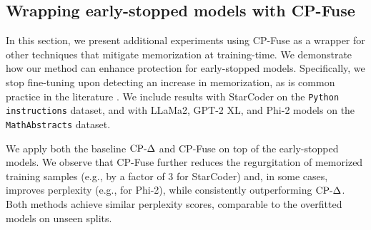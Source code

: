 \subsection{Wrapping early-stopped models with CP-Fuse}
\label{app:early_stopped}
In this section, we present additional experiments using CP-Fuse as a wrapper for other techniques that mitigate memorization at training-time. We demonstrate how our method can enhance protection for early-stopped models. Specifically, we stop fine-tuning upon detecting an increase in memorization, as is common practice in the literature \citep{mireshghallah2022memorization, mm_mem2024}. We include results with StarCoder on the \texttt{Python instructions} dataset, and with LLaMa2, GPT-2 XL, and Phi-2 models on the \texttt{MathAbstracts} dataset.

We apply both the baseline $\text{CP-}\Delta$ and CP-Fuse on top of the early-stopped models. We observe that CP-Fuse further reduces the regurgitation of memorized training samples (e.g., by a factor of 3 for StarCoder) and, in some cases, improves perplexity (e.g., for Phi-2), while consistently outperforming $\text{CP-}\Delta$. Both methods achieve similar perplexity scores, comparable to the overfitted models on unseen splits.


